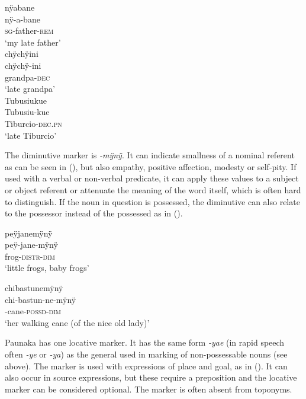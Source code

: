 \ea\label{ex:Sketch-Deceased}
  \ea
\begingl
\glpreamble nÿabane\\
\gla nÿ-a-bane\\
\textsc{sg}-father-\textsc{rem}\\
\glft ‘my late father’\\
\endgl
  \ex
\begingl
\glpreamble chÿchÿini\\
\gla chÿchÿ-ini\\
\glb grandpa-\textsc{dec}\\
\glft ‘late grandpa’\\
\endgl
  \ex
\begingl
\glpreamble Tubusiukue\\
\gla Tubusiu-kue\\
\glb Tiburcio-\textsc{dec.pn}\\
\glft ‘late Tiburcio’\\
\endgl
\z
\xe
{}

The diminutive marker is \textit{-mÿnÿ}. It can indicate smallness of a nominal referent as can be seen in (), but also empathy, positive affection, modesty or self-pity. If used with a verbal or non-verbal predicate, it can apply these values to a subject or object referent or attenuate the meaning of the word itself, which is often hard to distinguish. If the noun in question is possessed, the diminutive can also relate to the possessor instead of the possessed as in ().

\ea\label{ex:Sketch-Dim-N}
\begingl
\glpreamble peÿjanemÿnÿ\\
\gla peÿ-jane-mÿnÿ\\
\glb frog-\textsc{distr}-\textsc{dim}\\
\glft ‘little frogs, baby frogs’\\
\endgl
\xe

\ea\label{ex:Sketch-Dim-N-2}
\begingl
\glpreamble chibastunemÿnÿ\\
\gla chi-bastun-ne-mÿnÿ\\
-cane-\textsc{possd}-\textsc{dim}\\
\glft ‘her walking cane (of the nice old lady)’\\
\endgl
\xe
{}

Paunaka has one locative marker. It has the same form \textit{-yae} (in rapid speech often \textit{-ye} or \textit{-ya}) as the general  used in  marking of non-possessable nouns (see above). The  marker is used with expressions of place and goal, as in (). It can also occur in source expressions, but these require a  preposition and the locative marker can be considered optional. The marker is often absent from toponyms. 


